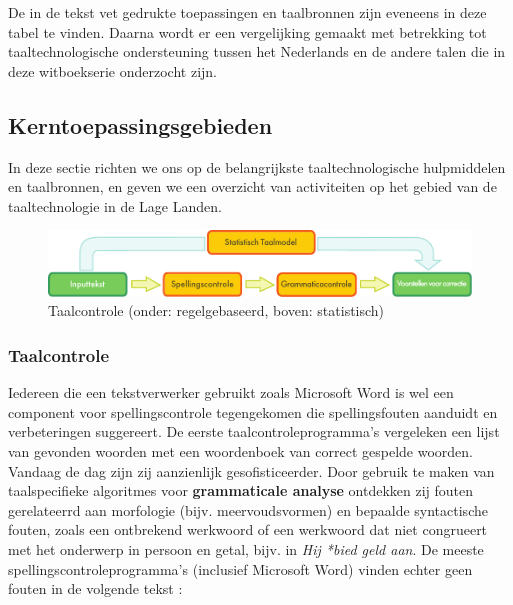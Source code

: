 \documentclass[]{../../metanetpaper}
\begin{document}
\begin{multicols}{2}
De in de tekst vet gedrukte toepassingen en taalbronnen zijn eveneens in deze tabel te vinden. Daarna wordt er een vergelijking gemaakt met betrekking tot  taaltechnologische ondersteuning tussen het Nederlands en de andere talen die in deze witboekserie onderzocht zijn.


\subsection{Kerntoepassingsgebieden}


In deze sectie richten we ons op de belangrijkste taaltechnologische hulpmiddelen en taalbronnen, en geven we een overzicht van  activiteiten op het gebied van de taaltechnologie in de Lage Landen.

\begin{figure}[t]
  \center
  \includegraphics[width=\textwidth]{../_media/dutch/language_checking}
  \caption{Taalcontrole (onder: regelgebaseerd, boven: statistisch)}
  \label{fig:langcheckingaarch_de}
\end{figure}


\subsubsection{Taalcontrole}

    Iedereen die een tekstverwerker gebruikt zoals Microsoft Word is wel een component voor spellingscontrole tegengekomen die spellingsfouten aanduidt en verbeteringen suggereert.  De eerste taalcontroleprogramma's vergeleken een lijst van gevonden woorden met een woordenboek van correct gespelde woorden. Vandaag de dag zijn zij aanzienlijk gesofisticeerder. Door gebruik te maken van taalspecifieke algoritmes voor \textbf{grammaticale analyse} ontdekken zij fouten gerelateerrd aan morfologie (bijv. meervoudsvormen) en bepaalde syntactische fouten, zoals een ontbrekend werkwoord of een werkwoord dat niet congrueert met het onderwerp in persoon en getal, bijv. in \emph{Hij *bied geld aan}. De meeste spellingscontroleprogramma's (inclusief Microsoft Word) vinden echter geen fouten in de volgende tekst \cite{zar1}:



\end{multicols}
\end{document}
